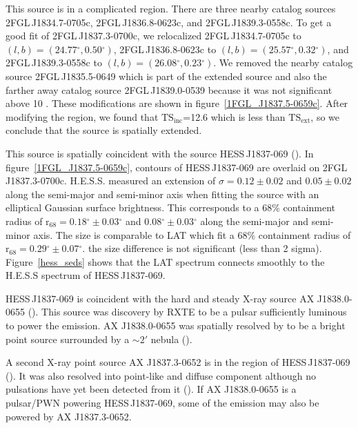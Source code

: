\documentclass[12pt,preprint]{aastex}
\newcommand{\gev}{\text{GeV}\xspace}
\newcommand{\tev}{\text{TeV}\xspace}
\newcommand{\tsext}{{\ensuremath{\text{TS}_{\text{ext}}}}\xspace}
\newcommand{\tsinc}{\ensuremath{\text{TS}_{\text{inc}}}\xspace}
\newcommand{\chandra}{\text{{\em Chandra}}\xspace}
\newcommand{\rsixeight}{{\ensuremath{\text{r}_{68}}}\xspace}
\renewcommand{\deg}{\ensuremath{^\circ}\xspace}
\begin{document}
This source is in a complicated region. There are three nearby
catalog sources 2FGL\,J1834.7-0705c, 2FGL\,J1836.8-0623c, and
2FGL\,J1839.3-0558c.  To get a good fit of 2FGL\,J1837.3-0700c, we
relocalized 2FGL\,J1834.7-0705c to $(l,b)=(24.77\deg,0.50\deg)$,
2FGL\,J1836.8-0623c to $(l,b)=(25.57\deg,0.32\deg)$, and
2FGL\,J1839.3-0558c to $(l,b)=(26.08\deg,0.23\deg)$.  We removed the
nearby catalog source 2FGL\,J1835.5-0649 which is part of the extended
source and also the farther away catalog source 2FGL\,J1839.0-0539
because it was not significant above 10 \gev. These modifications are
shown in figure~\ref{1FGL_J1837.5-0659c}.  After modifying the region,
we found that \tsinc=12.6 which is less than \tsext, so we conclude that
the source is spatially extended.

This source is spatially coincident with the \tev source HESS\,J1837-069
(\cite{hess_plane_survey}).  In figure~\ref{1FGL_J1837.5-0659c}, contours
of HESS\,J1837-069 are overlaid on 2FGL\,J1837.3-0700c. H.E.S.S. measured
an extension of $\sigma=0.12\pm0.02$ and $0.05\pm0.02$
along the semi-major and semi-minor axis when fitting the source
with an elliptical Gaussian surface brightness.  This corresponds
to a 68\% containment radius of $\rsixeight=0.18\deg\pm0.03\deg$ and
$0.08\deg\pm0.03\deg$ along the semi-major and semi-minor axis. The
size is comparable to LAT which fit a 68\% containment radius of
$\rsixeight=0.29\deg\pm0.07\deg$.  the size difference is not significant
(less than 2 sigma).  Figure~\ref{hess_seds} shows that the LAT spectrum
connects smoothly to the H.E.S.S spectrum of HESS\,J1837-069.

HESS\,J1837-069 is coincident with the hard
and steady X-ray source AX J1838.0-0655
(\cite{einstein_galactic_plane_survey,hard_x-ray_asca,integral_AX_J1838.0-0655,swift_follow_up,pulsations_HESS_J1837-069,suzaku_HESS_J1837-069}).
This source was discovery by RXTE to 
be a pulsar 
sufficiently luminous to power the \tev emission.
AX J1838.0-0655 was spatially resolved by \chandra to be a bright point source
surrounded by a $\sim2'$ nebula (\cite{pulsations_HESS_J1837-069}).

A second X-ray point source AX J1837.3-0652 is in the region of HESS\,J1837-069
(\cite{hard_x-ray_asca,swift_follow_up,pulsations_HESS_J1837-069,suzaku_HESS_J1837-069}).
It was also resolved into point-like and diffuse component
although no pulsations have yet been detected from it
(\cite{pulsations_HESS_J1837-069}).  If AX J1838.0-0655 is a pulsar/PWN
powering HESS\,J1837-069, some of the \tev emission
may also be powered by AX J1837.3-0652.
\end{document}

